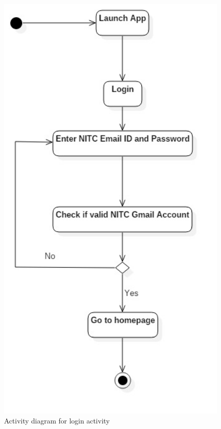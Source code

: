 \documentclass[a4paper,12pt]{article}
\begin{document}
{
\begin{figure}[h!]
  \includegraphics[width=1\textwidth]{activity1}
  \caption{Activity diagram for login activity}
\end{figure}
\begin{figure}[h!]

\end{figure}}
\end{document}
